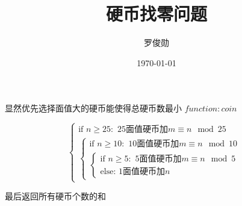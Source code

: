 \documentclass[12pt, a4paper, oneside]{ctexart}
\title{\huge\textbf{硬币找零问题}}
\author{罗俊勋}
\date{\today}
\begin{document}
\maketitle

显然优先选择面值大的硬币能使得总硬币数最小
$function:coin$

\[  
\begin{cases}  
    \text{if } n \geq 25: \text{ 25面值硬币加}m \equiv n \mod 25 \\  
    \begin{cases}  
        \text{if } n \geq 10: \text{ 10面值硬币加}m \equiv n \mod 10 \\  
        \begin{cases}  
            \text{if } n \geq 5: \text{ 5面值硬币加}m \equiv n \mod 5 \\  
            \text{else: 1面值硬币加}n  
        \end{cases}  
    \end{cases}  
\end{cases}  
\]  

最后返回所有硬币个数的和






















% 
% 
\end{document}
